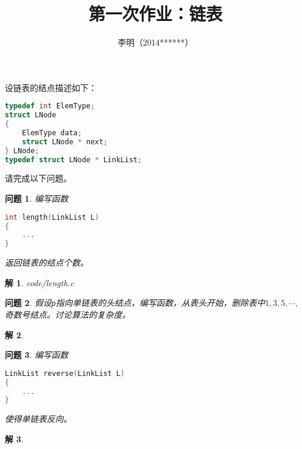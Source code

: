 \documentclass[10pt,a4paper,twoside,openright,titlepage,fleqn,
tablecaptionabove]{article}
\begin{document}
\begin{CJK}{UTF8}{gkai}

\title{第一次作业：链表}
\author{李明（2014******）} %
\maketitle

\newtheorem*{jie}{{解}}
\newtheorem{wenti}{{问题}}


设链表的结点描述如下：
\begin{lstlisting}[language=C]
typedef int ElemType;
struct LNode
{
	ElemType data;
	struct LNode * next;
} LNode;
typedef struct LNode * LinkList;
\end{lstlisting}
请完成以下问题。

\begin{wenti}
编写函数
\begin{lstlisting}[language=C]
int length(LinkList L)
{
	...
}
\end{lstlisting}
返回链表的结点个数。
\end{wenti}

\begin{jie}

{code/length.c}
\end{jie}

\begin{wenti}
假设{\tt p}指向单链表的头结点，编写函数，从表头开始，删除表中$1,3,5,\cdots,$奇数号结点。讨论算法的复杂度。
\end{wenti}

\begin{jie}
	
\end{jie}

\begin{wenti}
编写函数
\begin{lstlisting}[language=C]
LinkList reverse(LinkList L)
{
	...
}
\end{lstlisting}
使得单链表反向。
\end{wenti}

\begin{jie}
	
\end{jie}


\end{CJK}
\end{document}

